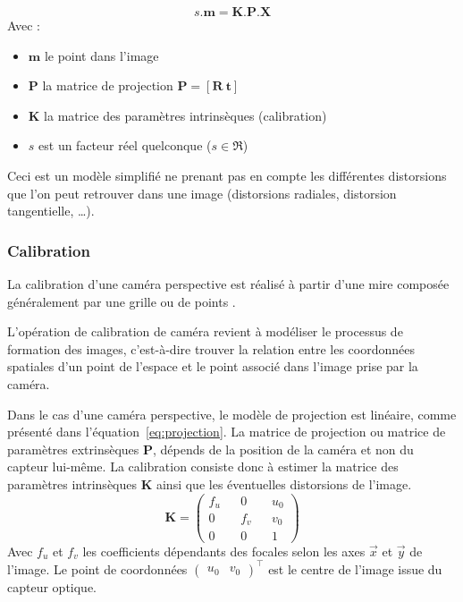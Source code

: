 \begin{equation}
s.\mathbf{m} = \mathbf{K}.\mathbf{P}.\mathbf{X}
\end{equation}
Avec : 
\begin{itemize}
\item $\mathbf{m}$ le point dans l'image
\item $\mathbf{P}$ la matrice de projection 
$\mathbf{P} = [ \mathbf{R} ~ \mathbf{t} ]$
\item $\mathbf{K}$ la matrice des paramètres intrinsèques (calibration)
\item $s$ est un facteur réel quelconque ($s \in \Re$)
\end{itemize}

Ceci est un modèle simplifié ne prenant pas en compte les différentes distorsions que l'on peut retrouver dans une image (distorsions radiales, distorsion tangentielle, \dots).

\subsubsection{Calibration}
\label{subsub:calibration}
La calibration d'une caméra perspective est réalisé à partir d'une mire composée généralement par une grille ou de points \cite{HoraudBook, Hartley03Book}.

L'opération de calibration de caméra revient à modéliser le processus de formation des images, c'est-à-dire trouver la relation entre les coordonnées spatiales d'un point de l'espace et le point associé dans l'image prise par la caméra.

Dans le cas d'une caméra perspective, le modèle de projection est linéaire, comme présenté dans l'équation~\ref{eq:projection}.
La matrice de projection ou matrice de paramètres extrinsèques $\mathbf{P}$, dépends de la position de la caméra et non du capteur lui-même.
La calibration consiste donc à estimer la matrice des paramètres intrinsèques $\mathbf{K}$ ainsi que les éventuelles distorsions de l'image.
$$
\mathbf{K} = \begin{pmatrix}f_u && 0 && u_0 \\ 0 && f_v && v_0 \\ 0 && 0 && 1\end{pmatrix} 
$$
Avec $f_u$ et $f_v$ les coefficients dépendants des focales selon les axes $\vec{x}$ et $\vec{y}$ de l'image.
Le point de coordonnées $\begin{pmatrix}u_0&v_0\end{pmatrix}^\top$ est le centre de l'image issue du capteur optique.

